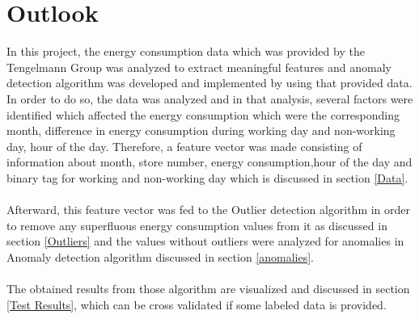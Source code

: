 \documentclass[12pt]{article}
\begin{document}
\section{Outlook}
\label{Outlook}
In this project, the energy consumption data which was provided by the Tengelmann Group was analyzed to extract meaningful features and anomaly detection algorithm was developed and implemented by using that provided data. In order to do so, the data was analyzed and in that analysis, several factors were identified which affected the energy consumption which were the corresponding month, difference in energy consumption during working day and non-working day, hour of the day. Therefore, a feature vector was made consisting of information about month, store number, energy consumption,hour of the day and binary tag for working and non-working day which is discussed in section \ref{Data}.
\paragraph{} Afterward,  this feature vector was fed to the Outlier detection algorithm in order to remove any superfluous energy consumption values from it as discussed in section \ref{Outliers} and the values without outliers were analyzed for anomalies in Anomaly detection algorithm discussed in section \ref{anomalies}.

\paragraph{} The obtained results from those algorithm are visualized and discussed in section \ref{Test Results}, which can be cross validated if some labeled data is provided.




%
%

\end{document}
